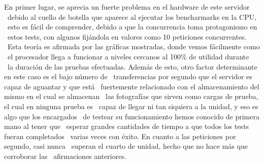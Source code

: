 \documentclass[11pt,twoside,a4paper]{book}
\begin{document}
En primer lugar, se aprecia un fuerte problema en el hardware de este servidor \
debido al cuello de botella que aparece al ejecutar los bencharmarks en la CPU, \
esto es fácil de comprender, debido a que la concurrencia toma protagonismo en \
estos tests, con algunos fijándola en valores como 10 peticiones concurrentes. \
Esta teoría es afirmada por las gráficas mostradas, donde vemos fácilmente como \
el procesador llega a funcionar a niveles cercanos al 100\% de utilidad durante \
la duración de las pruebas efectuadas.\newline \newline
\indent Además de esto, otro factor determinante en este caso es el bajo número de \
transferencias por segundo que el servidor es capaz de aguantar y que está \
fuertemente relacionado con el almacenamiento del mismo en el cual se almacenan \
las fotografías que sirven como cargas de prueba, el cual en ninguna prueba es \
capaz de llegar ni tan siquiera a la unidad, y eso es algo que los encargados \
de testear su funcionamiento hemos conocido de primera mano al tener que \
esperar grandes cantidades de tiempo a que todos los tests fueran completados \
varias veces con éxito. En cuanto a las peticiones por segundo, casi nunca \
superan el cuarto de unidad, hecho que no hace más que corroborar las \
afirmaciones anteriores. \newline

\end{document}
